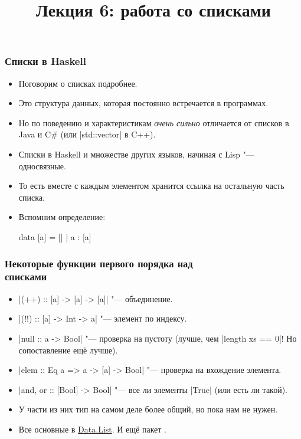 \documentclass[11pt]{beamer}
\title{Лекция 6: работа со списками}
\begin{document}
\begin{frame}[plain]
  \maketitle
\end{frame}

\begin{frame}[fragile]
  \frametitle{Списки в Haskell}
  \begin{itemize}
    \item Поговорим о списках подробнее.
    \item Это структура данных, которая постоянно встречается в программах.
    \item Но по поведению и характеристикам \emph{очень сильно} отличается от списков в Java и C\# (или \haskinline|std::vector| в C++).
          \pause
    \item Списки в Haskell и множестве других языков, начиная с Lisp "--- односвязные.
          \pause
    \item То есть вместе с каждым элементом хранится ссылка на остальную часть списка.
    \item Вспомним определение:
          \begin{haskell}
            data [a] = [] | a : [a]
          \end{haskell}
  \end{itemize}
\end{frame}

\begin{frame}[fragile]
  \frametitle{Некоторые функции первого порядка над\\ списками}
  \begin{itemize}
    \item \haskinline|(++) :: [a] -> [a] -> [a]| \pause"--- объединение.
    \item \haskinline[escapeinside=``]|(!!) :: [a] -> Int -> a| \pause"--- элемент по индексу.
    \item \haskinline|null :: a -> Bool| \pause"--- проверка на пустоту (лучше, чем \haskinline|length xs == 0|! Но сопоставление ещё лучше).
    \item \haskinline|elem :: Eq a => a -> [a] -> Bool| \pause"--- проверка на вхождение элемента.
    \item \haskinline|and, or :: [Bool] -> Bool| \pause"--- все ли элементы \haskinline|True| (или есть ли такой).
          \pause
    \item У части из них тип на самом деле более общий, но пока нам не нужен.
          \pause
    \item Все основные в \href{https://hackage.haskell.org/package/base/docs/Data-List.html}{Data.List}. \pause И ещё пакет .
  \end{itemize}
\end{frame}
\end{document}
